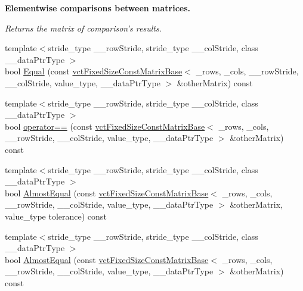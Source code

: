 \begin{Indent}{\bf Elementwise comparisons between matrices.}\par
{\em Returns the matrix of comparison's results. }\begin{DoxyCompactItemize}
\item 
{\footnotesize template$<$stride\-\_\-type \-\_\-\-\_\-row\-Stride, stride\-\_\-type \-\_\-\-\_\-col\-Stride, class \-\_\-\-\_\-data\-Ptr\-Type $>$ }\\bool \hyperlink{classvct_fixed_size_const_matrix_base_aac6b4cbb54feb3450720c226831c1a66}{Equal} (const \hyperlink{classvct_fixed_size_const_matrix_base}{vct\-Fixed\-Size\-Const\-Matrix\-Base}$<$ \-\_\-rows, \-\_\-cols, \-\_\-\-\_\-row\-Stride, \-\_\-\-\_\-col\-Stride, value\-\_\-type, \-\_\-\-\_\-data\-Ptr\-Type $>$ \&other\-Matrix) const 
\item 
{\footnotesize template$<$stride\-\_\-type \-\_\-\-\_\-row\-Stride, stride\-\_\-type \-\_\-\-\_\-col\-Stride, class \-\_\-\-\_\-data\-Ptr\-Type $>$ }\\bool \hyperlink{classvct_fixed_size_const_matrix_base_a9aaae9474065f05fab6384ed1d6f1c3e}{operator==} (const \hyperlink{classvct_fixed_size_const_matrix_base}{vct\-Fixed\-Size\-Const\-Matrix\-Base}$<$ \-\_\-rows, \-\_\-cols, \-\_\-\-\_\-row\-Stride, \-\_\-\-\_\-col\-Stride, value\-\_\-type, \-\_\-\-\_\-data\-Ptr\-Type $>$ \&other\-Matrix) const 
\item 
{\footnotesize template$<$stride\-\_\-type \-\_\-\-\_\-row\-Stride, stride\-\_\-type \-\_\-\-\_\-col\-Stride, class \-\_\-\-\_\-data\-Ptr\-Type $>$ }\\bool \hyperlink{classvct_fixed_size_const_matrix_base_ac068ac0c312282e0efa2c5f30eb18809}{Almost\-Equal} (const \hyperlink{classvct_fixed_size_const_matrix_base}{vct\-Fixed\-Size\-Const\-Matrix\-Base}$<$ \-\_\-rows, \-\_\-cols, \-\_\-\-\_\-row\-Stride, \-\_\-\-\_\-col\-Stride, value\-\_\-type, \-\_\-\-\_\-data\-Ptr\-Type $>$ \&other\-Matrix, value\-\_\-type tolerance) const 
\item 
{\footnotesize template$<$stride\-\_\-type \-\_\-\-\_\-row\-Stride, stride\-\_\-type \-\_\-\-\_\-col\-Stride, class \-\_\-\-\_\-data\-Ptr\-Type $>$ }\\bool \hyperlink{classvct_fixed_size_const_matrix_base_ac0a5e5006900f52e8eb60af04434aef1}{Almost\-Equal} (const \hyperlink{classvct_fixed_size_const_matrix_base}{vct\-Fixed\-Size\-Const\-Matrix\-Base}$<$ \-\_\-rows, \-\_\-cols, \-\_\-\-\_\-row\-Stride, \-\_\-\-\_\-col\-Stride, value\-\_\-type, \-\_\-\-\_\-data\-Ptr\-Type $>$ \&other\-Matrix) const 

\end{DoxyCompactItemize}
\end{Indent}
